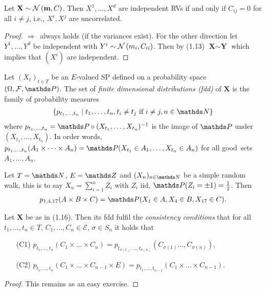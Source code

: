 \begin{prop}
Let $\textbf{X}\sim \mathcal{N}\left(\textbf{m},C\right)$.
Then $X^1,\dots,X^d$ are independent RVs if and only if $C_{ij}=0$ for all $i\not = j$, i.e., $X^i,X^j$ are uncorrelated.
\end{prop}
\begin{proof}
\glqq $\Rightarrow$\grqq\, always holds (if the variances exist).
For the other direction let $Y^1,\dots,Y^d$ be independent with $Y^i\sim \mathcal{N}\left(m_i,C_{ii}\right)$.
Then by (1.13) $\textbf{X} \sim \textbf{Y}$ which implies that $(X^i)$ are independent.
\end{proof}

\begin{defi}
Let $(X_t)_{t \in T}$ be an $E$-valued SP defined on a probability space $(\Omega,\mathcal{F},\Prob)$. The set of \emph{finite dimensional distributions (fdd)} of $\textbf{X}$ is the family of probability measures
\begin{align*}
\{p_{t_1,\dots,t_n}\mid t_1,\dots,t_n, t_i\not =t_j \text{ if } i \not = j,n\in \N\}
\end{align*}
where $p_{t_1,\dots,t_n}=\Prob \circ (X_{t_1},\dots,X_{t_n})^{-1}$ is the image of $\Prob$ under $(X_{t_1},\dots,X_{t_n})$.
In order words, $p_{t_1,\dots,t_n}(A_1\times \dots \times A_n)=\Prob(X_{t_1}\in A_1,\dots,X_{t_n}\in A_n)$ for all \glqq good\grqq\, sets $A_1,\dots,A_n$.
\end{defi}

\begin{bsp}
Let $T=\N$, $E=\Z$ and $(X_n)_{n\in \N}$ be a simple random walk, this is to say
$X_n=\sum_{i=1}^n Z_i$ with $Z_i$ iid, $\Prob(Z_i=\pm 1)=\frac{1}{2}$.
Then
\begin{align*}
p_{1,4,17}(A\times B\times C)=\Prob(X_1\in A,X_4\in B,X_{17}\in C).
\end{align*}
\end{bsp}

\begin{prop}
Let $\textbf{X}$ be as in (1.16). Then its fdd fulfil the \emph{consistency conditions} that for all $t_1,\dots,t_n \in T$, $C_1,\dots,C_n \in \mathcal{E}$, $\sigma\in S_n$ it holds that
\begin{enumerate}
\item[(C1)] $p_{t_1,\dots ,t_n}(C_1\times \dots \times C_n)=p_{t_{\sigma(1)},\dots ,t_{\sigma(n)}}(C_{\sigma(1)}\dots ,C_{\sigma(n)})$,
\item[(C2)] $p_{t_1,\dots , t_n}(C_1\times \dots \times C_{n-1}\times E)=p_{t_1,\dots ,t_{n-1}}(C_1\times \dots \times C_{n-1})$.
\end{enumerate}
\end{prop}
\begin{proof}
This remains as an easy exercise.
\end{proof}

